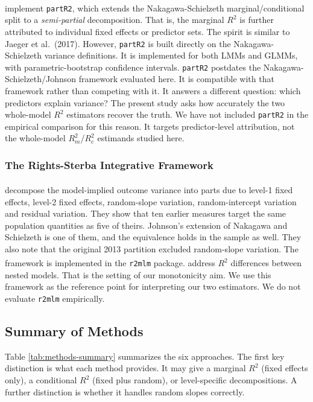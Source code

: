 \documentclass[
  11pt,
]{article}
\begin{document}
\textsuperscript{} implement \texttt{partR2}, which extends
the Nakagawa-Schielzeth marginal/conditional split to a
\emph{semi-partial} decomposition. That is, the marginal \(R^2\) is
further attributed to individual fixed effects or predictor sets.
The spirit is similar to Jaeger et al.~(2017). However, \texttt{partR2}
is built directly on the Nakagawa-Schielzeth variance
definitions. It is implemented for both LMMs and GLMMs, with
parametric-bootstrap confidence intervals. \texttt{partR2} postdates the
Nakagawa-Schielzeth/Johnson framework evaluated here. It is
compatible with that framework rather than competing with it. It
answers a different question: which predictors explain variance?
The present study asks how accurately the two whole-model \(R^2\)
estimators recover the truth. We have not included \texttt{partR2} in
the empirical comparison for this reason. It targets
predictor-level attribution, not the whole-model \(R^2_m\)/\(R^2_c\)
estimands studied here.

\subsubsection{The Rights-Sterba Integrative Framework}\label{the-rights-sterba-integrative-framework}

\textsuperscript{} decompose the model-implied
outcome variance into parts due to level-1 fixed effects, level-2
fixed effects, random-slope variation, random-intercept variation
and residual variation. They show that ten earlier measures
target the same population quantities as five of theirs. Johnson's
extension of Nakagawa and Schielzeth is one of them, and the
equivalence holds in the sample as well. They also note that the
original 2013 partition excluded random-slope variation. The
framework is implemented in the \texttt{r2mlm} package.\textsuperscript{} address \(R^2\)
differences between nested models. That is the setting of our
monotonicity aim. We use this framework as the reference point for
interpreting our two estimators. We do not evaluate \texttt{r2mlm}
empirically.

\subsection{Summary of Methods}\label{summary-of-methods}

Table \ref{tab:methods-summary} summarizes the six approaches.
The first key distinction is what each method provides. It may
give a marginal \(R^2\) (fixed effects only), a conditional \(R^2\)
(fixed plus random), or level-specific decompositions. A further
distinction is whether it handles random slopes correctly.
\end{document}
